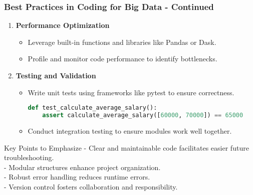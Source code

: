 \documentclass[aspectratio=169]{beamer}
\begin{document}
\begin{frame}[fragile]
    \frametitle{Best Practices in Coding for Big Data - Continued}
    \begin{enumerate}[resume]
        \item \textbf{Performance Optimization}
        \begin{itemize}
            \item Leverage built-in functions and libraries like Pandas or Dask.
            \item Profile and monitor code performance to identify bottlenecks.
        \end{itemize}

        \item \textbf{Testing and Validation}
        \begin{itemize}
            \item Write unit tests using frameworks like pytest to ensure correctness.
            \begin{lstlisting}[language=Python]
def test_calculate_average_salary():
    assert calculate_average_salary([60000, 70000]) == 65000
            \end{lstlisting}
            \item Conduct integration testing to ensure modules work well together.
        \end{itemize}
    \end{enumerate}

    \begin{block}{Key Points to Emphasize}
        - Clear and maintainable code facilitates easier future troubleshooting. \\
        - Modular structures enhance project organization. \\
        - Robust error handling reduces runtime errors. \\
        - Version control fosters collaboration and responsibility.
    \end{block}
\end{frame}
\end{document}

